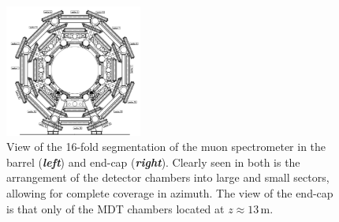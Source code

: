 \begin{figure}[!htb]
    \begin{center}
        \includegraphics[width=0.4\textwidth]{figures/chapter2/muon_spec/atlas_muon_barrel}
        \caption{
            View of the 16-fold segmentation of the muon spectrometer in the barrel (\textbf{\textit{left}})
            and end-cap (\textbf{\textit{right}}).
            Clearly seen in both is the arrangement of the detector chambers into large and
            small sectors, allowing for complete coverage in azimuth.
            The view of the end-cap is that only of the MDT chambers located at $z\approx13$\,m.
        }
        \label{fig:muon_segmentation}
    \end{center}
\end{figure}

